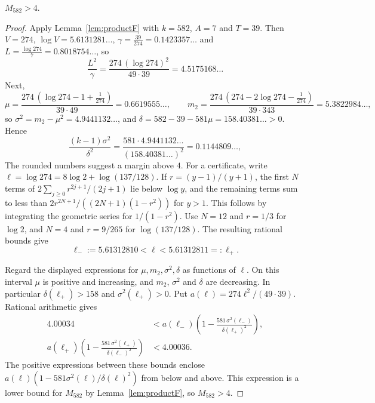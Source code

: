 \begin{proposition}\label{prop:mk582}
$M_{582}>4$.
\end{proposition}
\begin{proof}
Apply Lemma~\ref{lem:productF} with $k=582$, $A=7$ and $T=39$. Then $V=274$, $\log V=5.6131281\ldots$, $\gamma=\frac{39}{274}=0.1423357\ldots$ and $L=\frac{\log274}7=0.8018754\ldots$, so
\[
\frac{L^2}\gamma=\frac{274\,(\log274)^2}{49\cdot39}=4.5175168\ldots
\]
Next,
\[
\mu=\frac{274\,(\log274-1+\frac1{274})}{39\cdot49}=0.6619555\ldots,\qquad m_2=\frac{274\,(274-2\log274-\frac1{274})}{39\cdot343}=5.3822984\ldots,
\]
so $\sigma^2=m_2-\mu^2=4.9441132\ldots$, and $\delta=582-39-581\mu=158.40381\ldots>0$. Hence
\[
\frac{(k-1)\sigma^2}{\delta^2}=\frac{581\cdot4.9441132\ldots}{(158.40381\ldots)^2}=0.1144809\ldots,
\]
The rounded numbers suggest a margin above $4$. For a certificate, write $\ell=\log274=8\log2+\log(137/128)$. If $r=(y-1)/(y+1)$, the first $N$ terms of $2\sum_{j\ge0}r^{2j+1}/(2j+1)$ lie below $\log y$, and the remaining terms sum to less than $2r^{2N+1}/((2N+1)(1-r^2))$ for $y>1$. This follows by integrating the geometric series for $1/(1-r^2)$. Use $N=12$ and $r=1/3$ for $\log2$, and $N=4$ and $r=9/265$ for $\log(137/128)$. The resulting rational bounds give
\[
\ell_-:=5.61312810<\ell<5.61312811=:\ell_+.
\]

Regard the displayed expressions for $\mu,m_2,\sigma^2,\delta$ as functions of $\ell$. On this interval $\mu$ is positive and increasing, and $m_2$, $\sigma^2$ and $\delta$ are decreasing. In particular $\delta(\ell_+)>158$ and $\sigma^2(\ell_+)>0$. Put $a(\ell)=274\ell^2/(49\cdot39)$. Rational arithmetic gives
\[
\begin{aligned}
4.00034&<a(\ell_-)\left(1-\frac{581\,\sigma^2(\ell_-)}{\delta(\ell_+)^2}\right),\\
a(\ell_+)\left(1-\frac{581\,\sigma^2(\ell_+)}{\delta(\ell_-)^2}\right)&<4.00036.
\end{aligned}
\]
The positive expressions between these bounds enclose $a(\ell)(1-581\sigma^2(\ell)/\delta(\ell)^2)$ from below and above. This expression is a lower bound for $M_{582}$ by Lemma~\ref{lem:productF}, so $M_{582}>4$.
\end{proof}

